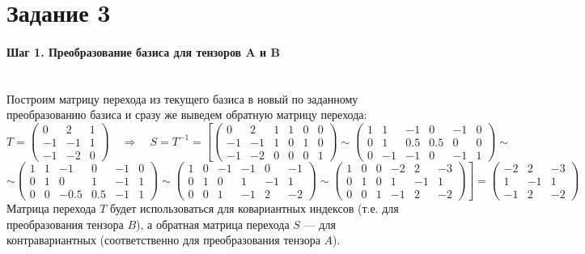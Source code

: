 \documentclass{article}
\begin{document}
\pagebreak
\section*{Задание 3}
\paragraph*{Шаг 1. Преобразование базиса для тензоров A и B} \, \\
Построим матрицу перехода из текущего базиса в новый по заданному преобразованию базиса и сразу же выведем обратную матрицу перехода:
$$T = \begin{pmatrix}
0 & 2 & 1 \\ -1 & -1 & 1 \\ -1 & -2 & 0
\end{pmatrix} \quad \Rightarrow \quad S = T^{-1} = \left[\left(\begin{array}{ccc|ccc}
0 & 2 & 1 & 1 & 0 & 0 \\
-1 & -1 & 1 & 0 & 1 & 0 \\
-1 & -2 & 0 & 0 & 0 & 1
\end{array}\right) \sim \left(\begin{array}{ccc|ccc}
1 & 1 & -1 & 0 & -1 & 0 \\
0 & 1 & 0.5 & 0.5 & 0 & 0 \\
0 & -1 & -1 & 0 & -1 & 1
\end{array}\right) \sim\right.$$
$$\left.\sim \left(\begin{array}{ccc|ccc}
1 & 1 & -1 & 0 & -1 & 0 \\
0 & 1 & 0 & 1 & -1 & 1 \\
0 & 0 & -0.5 & 0.5 & -1 & 1
\end{array}\right) \sim \left(\begin{array}{ccc|ccc}
1 & 0 & -1 & -1 & 0 & -1 \\
0 & 1 & 0 & 1 & -1 & 1 \\
0 & 0 & 1 & -1 & 2 & -2
\end{array}\right) \sim \left(\begin{array}{ccc|ccc}
1 & 0 & 0 & -2 & 2 & -3 \\
0 & 1 & 0 & 1 & -1 & 1 \\
0 & 0 & 1 & -1 & 2 & -2
\end{array}\right)\right] = \begin{pmatrix}
-2 & 2 & -3 \\ 1 & -1 & 1 \\ -1 & 2 & -2
\end{pmatrix}$$
Матрица перехода $T$ будет использоваться для ковариантных индексов (т.е. для преобразования тензора $B$), а обратная матрица перехода $S$ --- для контравариантных (соответственно для преобразования тензора $A$). \\ \, \\
\end{document}
